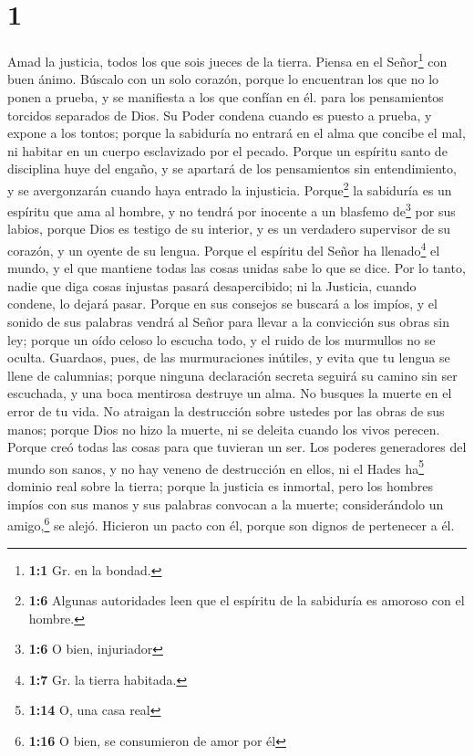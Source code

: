 \hypertarget{section}{%
\section{1}\label{section}}

 Amad la justicia, todos los que sois jueces de la tierra.
Piensa en el Señor\footnote{\textbf{1:1} Gr. en la bondad.} con buen
ánimo. Búscalo con un solo corazón,  porque lo encuentran
los que no lo ponen a prueba, y se manifiesta a los que confían en él.
 para los pensamientos torcidos separados de Dios. Su
Poder condena cuando es puesto a prueba, y expone a los tontos;
 porque la sabiduría no entrará en el alma que concibe el
mal, ni habitar en un cuerpo esclavizado por el pecado. 
Porque un espíritu santo de disciplina huye del engaño, y se apartará de
los pensamientos sin entendimiento, y se avergonzarán cuando haya
entrado la injusticia.  Porque\footnote{\textbf{1:6}
  Algunas autoridades leen que el espíritu de la sabiduría es amoroso
  con el hombre.} la sabiduría es un espíritu que ama al hombre, y no
tendrá por inocente a un blasfemo de\footnote{\textbf{1:6} O bien,
  injuriador} por sus labios, porque Dios es testigo de su interior, y
es un verdadero supervisor de su corazón, y un oyente de su lengua.
 Porque el espíritu del Señor ha llenado\footnote{\textbf{1:7}
  Gr. la tierra habitada.} el mundo, y el que mantiene todas las cosas
unidas sabe lo que se dice.  Por lo tanto, nadie que diga
cosas injustas pasará desapercibido; ni la Justicia, cuando condene, lo
dejará pasar.  Porque en sus consejos se buscará a los
impíos, y el sonido de sus palabras vendrá al Señor para llevar a la
convicción sus obras sin ley;  porque un oído celoso lo
escucha todo, y el ruido de los murmullos no se oculta. 
Guardaos, pues, de las murmuraciones inútiles, y evita que tu lengua se
llene de calumnias; porque ninguna declaración secreta seguirá su camino
sin ser escuchada, y una boca mentirosa destruye un alma.
 No busques la muerte en el error de tu vida. No atraigan
la destrucción sobre ustedes por las obras de sus manos; 
porque Dios no hizo la muerte, ni se deleita cuando los vivos perecen.
 Porque creó todas las cosas para que tuvieran un ser.
Los poderes generadores del mundo son sanos, y no hay veneno de
destrucción en ellos, ni el Hades ha\footnote{\textbf{1:14} O, una casa
  real} dominio real sobre la tierra;  porque la justicia
es inmortal,  pero los hombres impíos con sus manos y sus
palabras convocan a la muerte; considerándolo un amigo,\footnote{\textbf{1:16}
  O bien, se consumieron de amor por él} se alejó. Hicieron un pacto con
él, porque son dignos de pertenecer a él.

